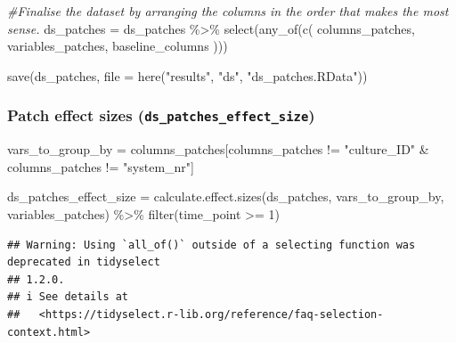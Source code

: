 \documentclass[
]{article}
\newenvironment{Shaded}{\begin{snugshade}}{\end{snugshade}}
\newcommand{\AttributeTok}[1]{\textcolor[rgb]{0.77,0.63,0.00}{#1}}
\newcommand{\CommentTok}[1]{\textcolor[rgb]{0.56,0.35,0.01}{\textit{#1}}}
\newcommand{\DecValTok}[1]{\textcolor[rgb]{0.00,0.00,0.81}{#1}}
\newcommand{\FunctionTok}[1]{\textcolor[rgb]{0.00,0.00,0.00}{#1}}
\newcommand{\NormalTok}[1]{#1}
\newcommand{\OtherTok}[1]{\textcolor[rgb]{0.56,0.35,0.01}{#1}}
\newcommand{\SpecialCharTok}[1]{\textcolor[rgb]{0.00,0.00,0.00}{#1}}
\newcommand{\StringTok}[1]{\textcolor[rgb]{0.31,0.60,0.02}{#1}}
\begin{document}
\begin{Shaded}
\begin{Highlighting}[]
\CommentTok{\#Finalise the dataset by arranging the columns in the order that makes the most sense.}
\NormalTok{ds\_patches }\OtherTok{=}\NormalTok{ ds\_patches }\SpecialCharTok{\%\textgreater{}\%}
  \FunctionTok{select}\NormalTok{(}\FunctionTok{any\_of}\NormalTok{(}\FunctionTok{c}\NormalTok{(}
\NormalTok{    columns\_patches,}
\NormalTok{    variables\_patches,}
\NormalTok{    baseline\_columns}
\NormalTok{  )))}
\end{Highlighting}
\end{Shaded}

\begin{Shaded}
\begin{Highlighting}[]
\FunctionTok{save}\NormalTok{(ds\_patches, }\AttributeTok{file =} \FunctionTok{here}\NormalTok{(}\StringTok{"results"}\NormalTok{, }\StringTok{"ds"}\NormalTok{, }\StringTok{"ds\_patches.RData"}\NormalTok{))}
\end{Highlighting}
\end{Shaded}

\hypertarget{patch-effect-sizes-ds_patches_effect_size}{%
\subsubsection{\texorpdfstring{Patch effect sizes
(\texttt{ds\_patches\_effect\_size})}{Patch effect sizes (ds\_patches\_effect\_size)}}\label{patch-effect-sizes-ds_patches_effect_size}}

\begin{Shaded}
\begin{Highlighting}[]
\NormalTok{vars\_to\_group\_by }\OtherTok{=}\NormalTok{ columns\_patches[columns\_patches }\SpecialCharTok{!=} \StringTok{"culture\_ID"} \SpecialCharTok{\&}\NormalTok{ columns\_patches }\SpecialCharTok{!=} \StringTok{"system\_nr"}\NormalTok{]}

\NormalTok{ds\_patches\_effect\_size }\OtherTok{=} \FunctionTok{calculate.effect.sizes}\NormalTok{(ds\_patches,}
\NormalTok{                                                vars\_to\_group\_by,}
\NormalTok{                                                variables\_patches) }\SpecialCharTok{\%\textgreater{}\%}
  \FunctionTok{filter}\NormalTok{(time\_point }\SpecialCharTok{\textgreater{}=} \DecValTok{1}\NormalTok{)}
\end{Highlighting}
\end{Shaded}

\begin{verbatim}
## Warning: Using `all_of()` outside of a selecting function was deprecated in tidyselect
## 1.2.0.
## i See details at
##   <https://tidyselect.r-lib.org/reference/faq-selection-context.html>
\end{verbatim}
\end{document}
